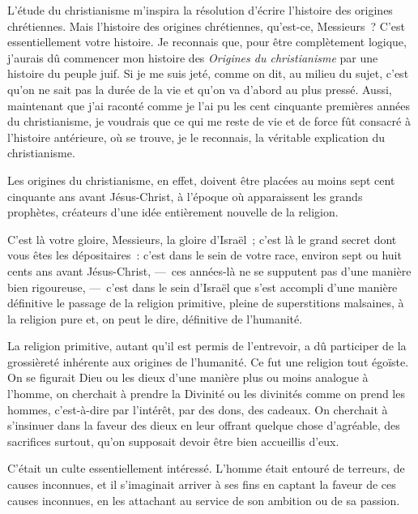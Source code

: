 \documentclass[french,twoside]{book} %
\newcommand\orgName[1]{#1}
\newcommand\persName[1]{#1}
\newcommand\placeName[1]{#1}
\begin{document}
L’étude du christianisme m’inspira la résolution d’écrire l’histoire des origines chrétiennes. Mais l’histoire des origines chrétiennes, qu’est-ce, Messieurs ? C’est essentiellement votre histoire. Je reconnais que, pour être complètement logique, j’aurais dû commencer mon histoire des \emph{Origines du christianisme} par une histoire du peuple juif. Si je me suis jeté, comme on dit, au milieu du sujet, c’est qu’on ne sait pas la durée de la vie et qu’on va d’abord au plus pressé. Aussi, maintenant que j’ai raconté comme je l’ai pu les cent cinquante premières années du christianisme, je voudrais que ce qui me reste de vie et de force fût consacré à l’histoire antérieure, où se trouve, je le reconnais, la véritable explication du christianisme.\par
Les origines du christianisme, en effet, doivent être placées au moins sept cent cinquante ans avant Jésus-Christ, à l’époque où apparaissent les grands prophètes, créateurs d’une idée entièrement nouvelle de la religion.\par
C’est là votre gloire, Messieurs, la gloire d’{\orgName Israël} ; c’est là le grand secret dont vous êtes les dépositaires : c’est dans le sein de votre race, environ sept ou huit cents ans avant Jésus-Christ, — ces années-là ne se supputent pas d’une manière bien rigoureuse, — c’est dans le sein d’{\placeName Israël} que s’est accompli d’une manière définitive le passage de la religion primitive, pleine de superstitions malsaines, à la religion pure et, on peut le dire, définitive de l’humanité.\par
La religion primitive, autant qu’il est permis de l’entrevoir, a dû participer de la grossièreté inhérente aux origines de l’humanité. Ce fut une religion tout égoïste. On se figurait {\persName Dieu} ou les {\orgName dieux} d’une manière plus ou moins analogue à l’homme, on cherchait à prendre la {\persName Divinité} ou les {\orgName divinités} comme on prend les hommes, c’est-à-dire par l’intérêt, par des dons, des cadeaux. On cherchait à s’insinuer dans la faveur des dieux en leur offrant quelque chose d’agréable, des sacrifices surtout, qu’on supposait devoir être bien accueillis d’eux.\par
C’était un culte essentiellement intéressé. L’homme était entouré de terreurs, de causes inconnues, et il s’imaginait arriver à ses fins en captant la faveur de ces causes inconnues, en les attachant au service de son ambition ou de sa passion.\par
\end{document}

